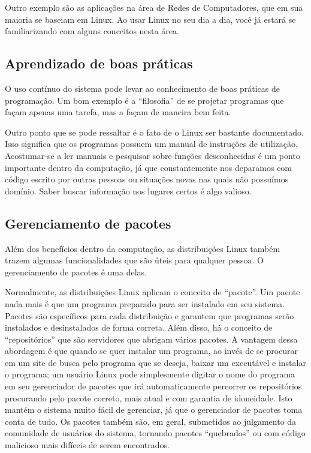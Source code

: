 \documentclass{handout_utfpr}
\begin{document}
Outro exemplo são as aplicações na área de Redes de Computadores, que em sua maioria se baseiam em Linux. Ao usar Linux no seu dia a dia, você já estará se familiarizando com alguns conceitos nesta área.

\subsection{Aprendizado de boas práticas}
O uso contínuo do sistema pode levar ao conhecimento de boas práticas de programação. Um bom exemplo é a ``filosofia'' de se projetar programas que façam apenas uma tarefa, mas a façam de maneira bem feita.

Outro ponto que se pode ressaltar é o fato de o Linux ser bastante documentado. Isso significa que os programas possuem um manual de instruções de utilização. Acostumar-se a ler manuais e pesquisar sobre funções desconhecidas é um ponto importante dentro da computação, já que constantemente nos deparamos com código escrito por outras pessoas ou situações novas nas quais não possuímos domínio. Saber buscar informação nos lugares certos é algo valioso.

\subsection{Gerenciamento de pacotes}
Além dos benefícios dentro da computação, as distribuições Linux também trazem algumas funcionalidades que são úteis para qualquer pessoa. O gerenciamento de pacotes é uma delas.

Normalmente, as distribuições Linux aplicam o conceito de ``pacote''. Um pacote nada mais é que um programa preparado para ser instalado em seu sistema. Pacotes são específicos para cada distribuição e garantem que programas serão instalados e desinstalados de forma correta. Além disso, há o conceito de ``repositórios'' que são servidores que abrigam vários pacotes. A vantagem dessa abordagem é que quando se quer instalar um programa, ao invés de se procurar em um site de busca pelo programa que se deseja, baixar um executável e instalar o programa; um usuário Linux pode simplesmente digitar o nome do programa em seu gerenciador de pacotes que irá automaticamente percorrer os repositórios procurando pelo pacote correto, mais atual e com garantia de idoneidade. Isto mantém o sistema muito fácil de gerenciar, já que o gerenciador de pacotes toma conta de tudo. Os pacotes também são, em geral, submetidos ao julgamento da comunidade de usuários do sistema, tornando pacotes ``quebrados'' ou com código malicioso mais difíceis de serem encontrados.
\end{document}
